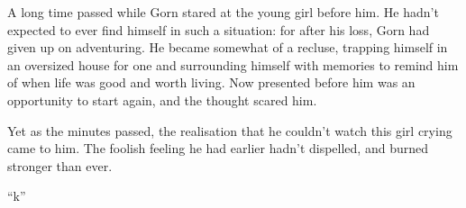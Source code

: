A long time passed while Gorn stared at the young girl before him. He hadn't
expected to ever find himself in such a situation: for after his loss, Gorn had
given up on adventuring. He became somewhat of a recluse, trapping himself in an
oversized house for one and surrounding himself with memories to remind him of
when life was good and worth living. Now presented before him was an opportunity
to start again, and the thought scared him.

Yet as the minutes passed, the realisation that he couldn't watch this girl
crying came to him. The foolish feeling he had earlier hadn't dispelled, and
burned stronger than ever.

``k''
